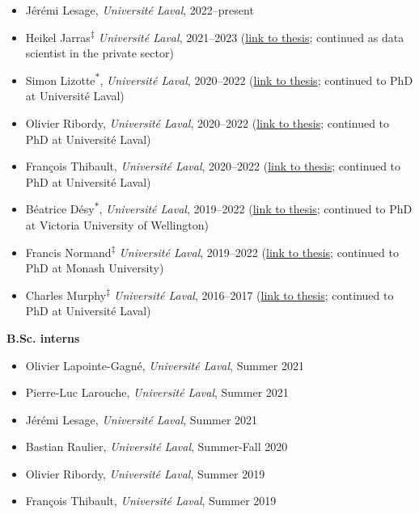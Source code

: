 \documentclass[11pt]{article}
\begin{document}
\begin{itemize}
  \item Jérémi Lesage, \textit{Universit\'e Laval}, 2022--present
  \item Heikel Jarras\textsuperscript{$\ddagger$} \textit{Universit\'e Laval}, 2021--2023 {\small (\href{http://hdl.handle.net/20.500.11794/125407}{link to thesis}; continued as data scientist in the private sector)}
  \item Simon Lizotte\textsuperscript{$\ast$}, \textit{Universit\'e Laval}, 2020--2022 {\small(\href{http://antoineallard.github.io/files/theses/Lizotte.2022.MSc.pdf}{link to thesis}; continued to PhD at Université Laval)}
  \item Olivier Ribordy, \textit{Universit\'e Laval}, 2020--2022 {\small(\href{http://antoineallard.github.io/files/theses/Ribordy.2022.MSc.pdf}{link to thesis}; continued to PhD at Université Laval)}
  \item Fran\c{c}ois Thibault, \textit{Universit\'e Laval}, 2020--2022 {\small(\href{http://antoineallard.github.io/files/theses/Thibault.2022.MSc.pdf}{link to thesis}; continued to PhD at Université Laval)}
  \item B\'eatrice D\'esy\textsuperscript{$\ast$}, \textit{Universit\'e Laval}, 2019--2022 {\small(\href{http://antoineallard.github.io/files/theses/Desy.2022.MSc.pdf}{link to thesis}; continued to PhD at Victoria University of Wellington)}
  \item Francis Normand\textsuperscript{$\ddagger$} \textit{Universit\'e Laval}, 2019--2022 {\small(\href{http://hdl.handle.net/20.500.11794/73573}{link to thesis}; continued to PhD at Monash University)}
  \item Charles Murphy\textsuperscript{$\ddagger$} \textit{Universit\'e Laval}, 2016--2017 {\small(\href{http://hdl.handle.net/20.500.11794/30382}{link to thesis}; continued to PhD at Université Laval)}
\end{itemize}
%
%
%
\textbf{B.Sc. interns}
%
\begin{itemize}
  \item Olivier Lapointe-Gagn\'e, \textit{Universit\'e Laval}, Summer 2021
  \item Pierre-Luc Larouche, \textit{Universit\'e Laval}, Summer 2021
  \item Jérémi Lesage, \textit{Universit\'e Laval}, Summer 2021
  \item Bastian Raulier, \textit{Universit\'e Laval}, Summer-Fall 2020
  \item Olivier Ribordy, \textit{Universit\'e Laval}, Summer 2019
  \item Fran\c{c}ois Thibault, \textit{Universit\'e Laval}, Summer 2019
\end{itemize}
\end{document}
